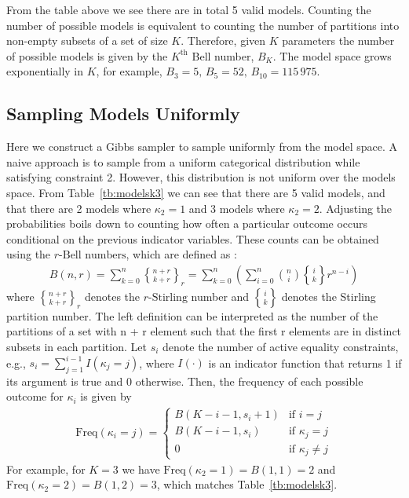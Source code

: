 \documentclass[]{article}
\newcommand{\cindicator}{\kappa}%
\newcommand{\stirling}[2]{\genfrac{\{}{\}}{0pt}{}{#1}{#2}} %
\newcommand{\bellnum}[2]{B\left(#1, #2\right)}
\newcommand{\frequency}[1]{\text{Freq}\left(#1\right)}
\begin{document}
From the table above we see there are in total 5 valid models.
Counting the number of possible models is equivalent to counting the number of partitions into non-empty subsets of a set of size $K$.
Therefore, given $K$ parameters the number of possible models is given by the $K^\text{th}$ Bell number, $B_K$.
The model space grows exponentially in $K$, for example, $B_3 = 5,\, B_5 = 52,\, B_{10} = 115 \,975$.


\subsection*{Sampling Models Uniformly}
Here we construct a Gibbs sampler to sample uniformly from the model space.
A naive approach is to sample from a uniform categorical distribution while satisfying constraint 2.
However, this distribution is not uniform over the models space.
From Table~\ref{tb:modelsk3} we can see that there are 5 valid models, and that there are 2 models where $\kappa_2 = 1$ and 3 models where $\kappa_2 = 2$.
Adjusting the probabilities boils down to counting how often a particular outcome occurs conditional on the previous indicator variables.
These counts can be obtained using the $r\text{-Bell numbers}$, which are defined as \parencite{mezo2011r}:
\begin{align*}
	\bellnum{n}{r} = 
	\sum_{k=0}^{n} \stirling{n+r}{k+r}_r =
	\sum_{k=0}^{n} \left(\sum_{i=0}^{n} \binom{n}{i} \stirling{i}{k} r^{n - i} \right)
\end{align*}
where $\stirling{n+r}{k+r}_r$ denotes the $r\text{-Stirling}$ number and $\stirling{i}{k}$ denotes the Stirling partition number.
The left definition can be interpreted as the number of the partitions of a set with n + r element such that the first r elements are in distinct subsets in each partition.
Let $s_i$ denote the number of active equality constraints, e.g., $s_i = \sum_{j = 1}^{i-1} I(\cindicator_j = j)$, where $I(\cdot)$ is an indicator function that returns 1 if its argument is true and 0 otherwise.
Then, the frequency of each possible outcome for $\cindicator_i$ is given by
\begin{align*}
	\frequency{\cindicator_i = j} = \begin{cases}
	\bellnum{K - i - 1}{s_i + 1} 		& \text{if } i = j					\\
	\bellnum{K - i - 1}{s_i} 			& \text{if } \cindicator_j = j 		\\
	0 									& \text{if } \cindicator_j \neq j
	\end{cases}
\end{align*}
For example, for $K = 3$ we have $\frequency{\cindicator_2 = 1} = \bellnum{1}{1} = 2$ and $\frequency{\cindicator_2 = 2} = \bellnum{1}{2} = 3$, which matches Table~\ref{tb:modelsk3}.
\end{document}
